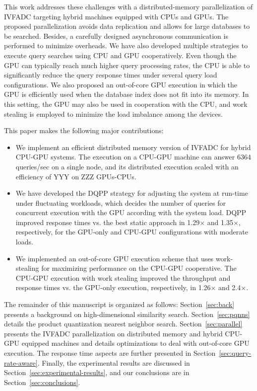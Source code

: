 This work addresses these challenges with a distributed-memory parallelization of IVFADC targeting hybrid machines equipped with CPUs and GPUs. The proposed parallelization avoids data replication and allows for large databases to be searched. Besides, a carefully designed asynchronous communication is performed to minimize overheads. We have also developed multiple strategies to execute query searches using CPU and GPU cooperatively. Even though the GPU can typically reach much higher query processing rates, the CPU is able to significantly reduce the query response times under several query load configurations. We also proposed an out-of-core GPU execution in which the GPU is efficiently used  
when the database index does not fit into its memory. In this setting, the GPU may also be used in cooperation with the CPU, and work stealing is employed to minimize the load imbalance among the devices. 

This paper makes the following major contributions:

\begin{itemize}
    \item We implement an efficient distributed memory version of IVFADC for hybrid CPU-GPU systems. The execution on a CPU-GPU machine can answer 6364 queries/sec on a single node, and its distributed execution scaled with an efficiency of YYY on ZZZ GPUs-CPUs.
    
    \item We have developed the DQPP strategy for adjusting the system at run-time under fluctuating workloads, which decides the number of queries for concurrent execution with the GPU according with the system load. DQPP improved response times vs. the best static approach in 1.29$\times$ and 1.35$\times$, respectively, for the GPU-only and CPU-GPU configurations with moderate loads.
    
    \item We implemented an out-of-core GPU execution scheme that uses work-stealing for maximizing performance on the CPU-GPU cooperative. The CPU-GPU execution with work stealing improved the throughput and response times vs. the GPU-only execution, respectively, in 1.26$\times$ and 2.4$\times$. 
    
\end{itemize}

The remainder of this manuscript is organized as follows: Section~\ref{sec:back} presents a background on high-dimensional similarity search. Section~\ref{sec:pqnns} details the product quantization nearest neighbor search. Section~\ref{sec:parallel} presents the IVFADC parallelization on distributed memory and hybrid CPU-GPU equipped machines and details optimizations to deal with out-of-core GPU execution. The response time aspects are further presented in Section~\ref{sec:query-rate-aware}. Finally, the experimental results are discussed in Section~\ref{sec:experimental-results}, and our conclusions are in Section~\ref{sec:conclusions}.